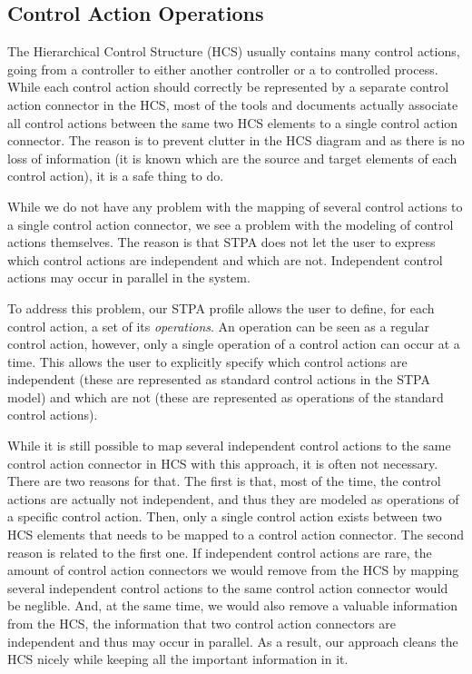 \documentclass[conference]{IEEEtran}
\begin{document}
\subsection{Control Action Operations}

The Hierarchical Control Structure (HCS) usually contains many control actions,
going from a controller to either another controller or a to controlled process.
While each control action should correctly be represented by a separate control
action connector in the HCS, most of the tools and documents actually associate
all control actions between the same two HCS elements to a single control action
connector. The reason is to prevent clutter in the HCS diagram and as there is
no loss of information (it is known which are the source and target elements of
each control action), it is a safe thing to do.

While we do not have any problem with the mapping of several control actions to
a single control action connector, we see a problem with the modeling of control
actions themselves. The reason is that STPA does not let the user to express
which control actions are independent and which are not. Independent control
actions may occur in parallel in the system.

To address this problem, our STPA profile allows the user to define, for each
control action, a set of its \emph{operations}. An operation can be seen as a
regular control action, however, only a single operation of a control action can
occur at a time. This allows the user to explicitly specify which control
actions are independent (these are represented as standard control actions in
the STPA model) and which are not (these are represented as operations of the
standard control actions).

While it is still possible to map several independent control actions to the
same control action connector in HCS with this approach, it is often not
necessary. There are two reasons for that. The first is that, most of the time,
the control actions are actually not independent, and thus they are modeled as
operations of a specific control action. Then, only a single control action
exists between two HCS elements that needs to be mapped to a control action
connector. The second reason is related to the first one. If independent control
actions are rare, the amount of control action connectors we would remove from
the HCS by mapping several independent control actions to the same control
action connector would be neglible. And, at the same time, we would also remove
a valuable information from the HCS, the information that two control action
connectors are independent and thus may occur in parallel. As a result, our
approach cleans the HCS nicely while keeping all the important information in
it.
\end{document}
